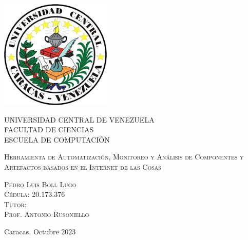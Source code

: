 \thispagestyle{empty}

\begin{minipage}[c][0.01\textheight][t]{0.85\textwidth}
\begin{center}

\includegraphics[scale=0.8]{./Figuras/ucv_logo.jpg}

\bigskip\bigskip\bigskip

{\centering \scshape \large
UNIVERSIDAD CENTRAL DE VENEZUELA \\
FACULTAD DE CIENCIAS \\
ESCUELA DE COMPUTACIÓN \\[38pt]}


\bigskip
{\scshape \LARGE 
Herramienta de Automatización, Monitoreo y Análisis de Componentes y Artefactos basados en el Internet de las Cosas 
\\[60pt]} 

\vspace{5mm}

{ \scshape \renewcommand\baselinestretch{1}\selectfont    
Pedro Luis Boll Lugo\\
Cédula: 20.173.376 \\[30pt]

Tutor:\\
Prof. Antonio Rusoniello\\[30pt]

\vspace{10mm}

Caracas, Octubre 2023\\[60pt]
\vfill
}


\end{center}
\end{minipage}